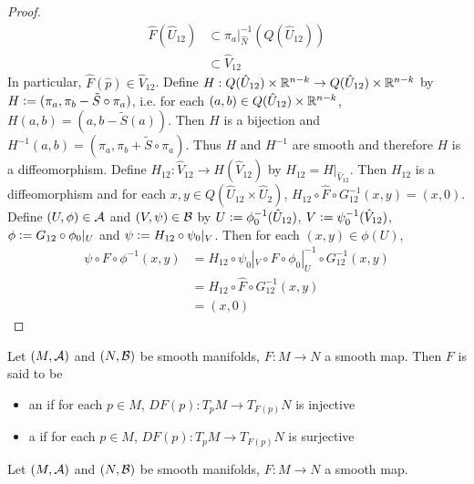 \documentclass{book}
\begin{document}
\begin{proof}
	 	\begin{align*}
	 		\hat{F} (\hat{U}_{12}) 
	 		& \subset \pi_a|_{\hat{N}}^{-1}(Q(\hat{U}_{12})) \\
	 		& \subset \hat{V}_{12}
	 	\end{align*}
	 	In particular, $\hat{F}(\hat{p}) \in \hat{V}_{12}$. Define $H: Q(\hat{U}_{12}) \times \mathbb{R}^{n-k} \rightarrow Q(\hat{U}_{12}) \times \mathbb{R}^{n-k}$ by $H \vcentcolon= (\pi_a, \pi_b - \tilde{S} \circ \pi_a)$, i.e. for each $(a,b) \in Q(\hat{U}_{12}) \times \mathbb{R}^{n-k}$, $H(a,b) = (a, b-\tilde{S}(a))$. Then $H$ is a bijection and $H^{-1}(a,b) = (\pi_a, \pi_b + \tilde{S} \circ \pi_a)$. Thus $H$ and $H^{-1}$ are smooth and therefore $H$ is a diffeomorphism. Define $H_{12}: \hat{V}_{12} \rightarrow H(\hat{V}_{12})$ by 
	 	$H_{12} = H|_{\hat{V}_{12}}$. Then $H_{12}$ is a diffeomorphism and for each $x,y \in Q(\hat{U}_{12} \times \hat{U}_{2})$, $H_{12} \circ \hat{F} \circ G_{12}^{-1}(x, y) = (x, 0)$. Define $(U, \phi) \in \mathcal{A}$ and $(V, \psi) \in \mathcal{B}$ by $U \vcentcolon= \phi_0^{-1}(\hat{U}_{12})$, $V \vcentcolon= \psi_0^{-1}(\hat{V}_{12})$, $\phi \vcentcolon= G_{12} \circ \phi_0|_{U}$ and $\psi \vcentcolon= H_{12} \circ \psi_0|_V$. Then for each $(x,y) \in \phi(U)$,
	 	\begin{align*}
	 		\psi \circ F \circ \phi^{-1}(x, y)
	 		& = H_{12} \circ \psi_0|_V \circ F \circ \phi_0|_U^{-1} \circ G_{12}^{-1} (x,y) \\
	 		& = H_{12} \circ \hat{F} \circ G_{12}^{-1}(x,y) \\
	 		& = (x, 0)
	 	\end{align*}
	\end{proof}
	
	\begin{defn}
		Let $(M, \mathcal{A})$ and $(N, \mathcal{B})$ be smooth manifolds, $F: M \rightarrow N$ a smooth map. Then $F$ is said to be 
		\begin{itemize}
		
			\item an  if for each $p \in M$, $DF(p):T_pM\rightarrow T_{F(p)}N$ is injective
			\item a  if for each $p \in M$, $DF(p) :T_pM\rightarrow T_{F(p)}N$ is surjective
		\end{itemize}
	\end{defn}
	
	\begin{ex}
	Let $(M, \mathcal{A})$ and $(N, \mathcal{B})$ be smooth manifolds, $F: M \rightarrow N$ a smooth map. 
	\end{ex}
	
\end{document}
